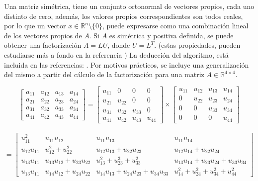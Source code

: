 \documentclass[11pt, spanish]{article}
\begin{document}
Una matriz simétrica, tiene un conjunto ortonormal de vectores propios, cada uno distinto de cero, además, los valores propios correspondientes son todos reales, por lo que un vector $x \in \mathbb{R}^{n} \setminus \{ 0 \}$, puede expresarse como una combinación lineal de los vectores propios de $A$. Si $A$ es simétrica y positiva definida, se puede obtener una factorización $A=LU$, donde $U = L^T$. (estas propiedades, pueden estudiarse más a fondo en la referencia \cite{suli2003introduction}) La deducción del algoritmo, está incluida en las referencias: . Por motivos prácticos, se incluye una generalización del mismo a partir del cálculo de la factorización para una matriz $A \in \mathbb{R}^{4 \times 4}$.

\[
\begin{bmatrix}
    a_{11} & a_{12} & a_{13} & a_{14} \\
    a_{21} & a_{22} & a_{23} & a_{24} \\
    a_{31} & a_{32} & a_{33} & a_{34} \\
    a_{41} & a_{42} & a_{43} & a_{44} 
\end{bmatrix}
=
\begin{bmatrix}
    u_{11} & 0 & 0 & 0 \\
    u_{21} & u_{22} & 0 & 0 \\
    u_{31} & u_{32} & u_{33} & 0 \\
    u_{41} & u_{42} & u_{43} & u_{44} 
\end{bmatrix}
\times
\begin{bmatrix}
    u_{11} & u_{12} & u_{13} & u_{14} \\
    0 & u_{22} & u_{23} & u_{24} \\
    0 & 0 & u_{33} & u_{34} \\
    0 & 0 & 0 & u_{44} 
\end{bmatrix}
\]\\
\[
=\begin{bmatrix}

    u_{11}^2 & 
    u_{11}u_{12} & 
    u_{11}u_{13} & 
    u_{11}u_{14} \\
    
    u_{12}u_{11} & 
    u_{12}^2+u_{22}^2 & 
    u_{12}u_{13}+u_{22}u_{23} & 
    u_{12}u_{14}+u_{22}u_{24} \\
    
    u_{13}u_{11} & 
    u_{13}u_{12}+u_{23}u_{22} & 
    u_{13}^2+u_{23}^3+u_{33}^2 &
    u_{13}u_{14}+u_{23}u_{24}+u_{33}u_{34} \\
    
    u_{13}u_{11} & 
    u_{14}u_{12}+u_{24}u_{22} & 
    u_{14}u_{13}+u_{24}u_{23}+u_{34}u_{33} & 
    u_{14}^2+u_{24}^2+u_{34}^2+u_{44}^2
    
\end{bmatrix}
\]
        
\end{document}
